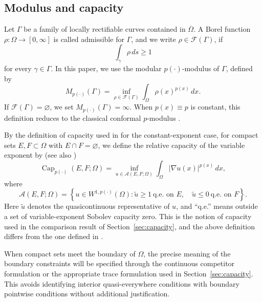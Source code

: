 \documentclass[12pt]{amsart}
\numberwithin{equation}{section}
\theoremstyle{plain}
\theoremstyle{definition}
\begin{document}
\subsection{Modulus and capacity}

Let $\Gamma$ be a family of locally rectifiable curves contained in
$\overline{\Omega}$. A Borel function $\rho:\Omega\longrightarrow[0,\infty]$
is called admissible for $\Gamma$, and we write
$\rho\in\mathcal F(\Gamma)$, if
\begin{equation*}
\int_\gamma \rho\,ds\ge1
\end{equation*}
for every $\gamma\in\Gamma$.
In this paper, we use the modular $p(\cdot)$-modulus of $\Gamma$,
defined by
\begin{equation*}
M_{p(\cdot)}(\Gamma)
=
\inf_{\rho\in\mathcal F(\Gamma)}
\int_\Omega \rho(x)^{p(x)}\,dx.
\end{equation*}
If $\mathcal F(\Gamma)=\varnothing$, we set
$M_{p(\cdot)}(\Gamma)=\infty.$
When $p(x)\equiv p$ is constant, this definition reduces to the
classical conformal $p$-modulus
\cite{Ahlfors,HKV,Vaisala}.


By the definition of capacity used in \cite[p. 27]{Heinonen} for the constant-exponent case,
for compact sets $E,F\subset\Omega$ with $E\cap F=\varnothing$, we define the relative capacity of the variable exponent by (see also \cite[Proposition 10.2.2]{Diening2011})
\begin{equation*}
\operatorname{Cap}_{p(\cdot)}(E,F;\Omega)
=
\inf_{u\in\mathcal A(E,F;\Omega)}
\int_\Omega |\nabla u(x)|^{p(x)}\,dx,
\end{equation*}
where
\begin{equation*}
\mathcal A(E,F;\Omega)
=
\left\{
u\in W^{1,p(\cdot)}(\Omega):
\widetilde u\ge1\ \text{q.e. on }E,\quad
\widetilde u\le0\ \text{q.e. on }F
\right\}.
\end{equation*}
Here $\widetilde u$ denotes the quasicontinuous representative of $u$,
and ``q.e.'' means outside a set of variable-exponent Sobolev capacity
zero. This is the notion of capacity used in the comparison result of Section~\ref{sec:capacity}, and the above definition differs from the one defined in \cite{HL}.

When compact sets meet the boundary of $\Omega$, the precise meaning of
the boundary constraints will be specified through the continuous
competitor formulation or the appropriate trace formulation used in
Section~\ref{sec:capacity}. This avoids identifying interior
quasi-everywhere conditions with boundary pointwise conditions without
additional justification.
\end{document}
